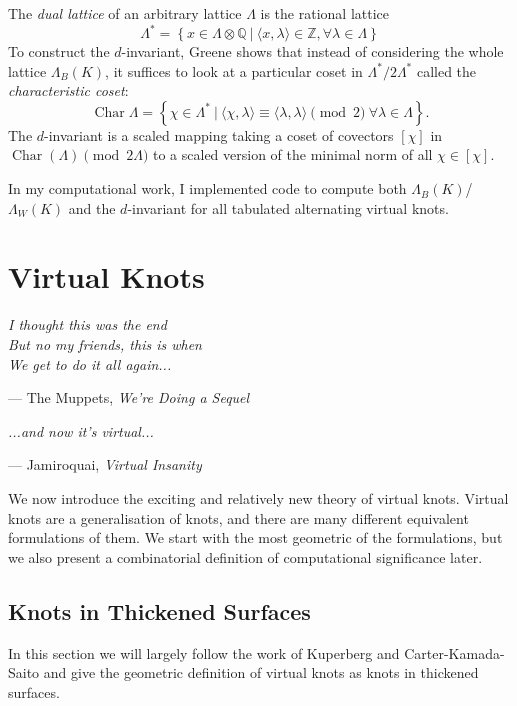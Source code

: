 \documentclass[12pt]{report}
\newcommand{\Z}{\mathbb{Z}}
\theoremstyle{upright}
\begin{document}
The \textit{dual lattice} of an arbitrary lattice $\Lambda$ is the rational lattice
\[\Lambda^{*} = \left\{ x \in \Lambda \otimes \mathbb{Q} \ \Big|\  \langle x, \lambda \rangle \in \Z, \forall \lambda \in \Lambda \right\}\]To construct the $d$-invariant, Greene shows that instead of considering the whole lattice $\Lambda_{B}(K)$, it suffices to look at a particular coset in $\Lambda^{*} / 2\Lambda^{*}$ called the \textit{characteristic coset}:
\[\operatorname{Char} \Lambda = \left\{ \chi \in \Lambda^{*} \ \Big|\  \langle\chi,\lambda\rangle \equiv \langle\lambda,\lambda\rangle \pmod 2\  \forall \lambda \in \Lambda \right\}.\]
The $d$-invariant is a scaled mapping taking a coset of covectors $[\chi]$ in $\operatorname{Char}(\Lambda) \pmod{2\Lambda}$ to a scaled version of the minimal norm of all $\chi \in [\chi]$.

In my computational work, I implemented code to compute both $\Lambda_{B}(K)$/$\Lambda_{W}(K)$ and the $d$-invariant for all tabulated alternating virtual knots.


\chapter{Virtual Knots}

\epigraph{\itshape I thought this was the end\\But no my friends, this is when\\We get to do it all again...}{--- The Muppets, \textit{We're Doing a Sequel}}
\epigraph{\itshape ...and now it's virtual...}{--- Jamiroquai, \textit{Virtual Insanity}}


We now introduce the exciting and relatively new theory of virtual knots. Virtual knots are a generalisation of knots, and there are many different equivalent formulations of them. We start with the most geometric of the formulations, but we also present a combinatorial definition of computational significance later.


\section{Knots in Thickened Surfaces}

In this section we will largely follow the work of Kuperberg \cite{what-is-a-virtual-link} and Carter-Kamada-Saito \cite{stable-equivalence-virtual-cobordisms} and give the geometric definition of virtual knots as knots in thickened surfaces.
\end{document}

